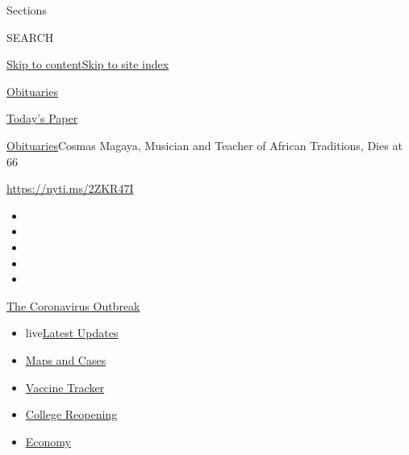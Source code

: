 Sections

SEARCH

\protect\hyperlink{site-content}{Skip to
content}\protect\hyperlink{site-index}{Skip to site index}

\href{https://www.nytimes.com/section/obituaries}{Obituaries}

\href{https://myaccount.nytimes.com/auth/login?response_type=cookie\&client_id=vi}{}

\href{https://www.nytimes.com/section/todayspaper}{Today's Paper}

\href{/section/obituaries}{Obituaries}\textbar{}Cosmas Magaya, Musician
and Teacher of African Traditions, Dies at 66

\url{https://nyti.ms/2ZKR47I}

\begin{itemize}
\item
\item
\item
\item
\item
\end{itemize}

\href{https://www.nytimes.com/news-event/coronavirus?action=click\&pgtype=Article\&state=default\&region=TOP_BANNER\&context=storylines_menu}{The
Coronavirus Outbreak}

\begin{itemize}
\tightlist
\item
  live\href{https://www.nytimes.com/2020/08/03/world/coronavirus-covid-19.html?action=click\&pgtype=Article\&state=default\&region=TOP_BANNER\&context=storylines_menu}{Latest
  Updates}
\item
  \href{https://www.nytimes.com/interactive/2020/us/coronavirus-us-cases.html?action=click\&pgtype=Article\&state=default\&region=TOP_BANNER\&context=storylines_menu}{Maps
  and Cases}
\item
  \href{https://www.nytimes.com/interactive/2020/science/coronavirus-vaccine-tracker.html?action=click\&pgtype=Article\&state=default\&region=TOP_BANNER\&context=storylines_menu}{Vaccine
  Tracker}
\item
  \href{https://www.nytimes.com/2020/08/02/us/covid-college-reopening.html?action=click\&pgtype=Article\&state=default\&region=TOP_BANNER\&context=storylines_menu}{College
  Reopening}
\item
  \href{https://www.nytimes.com/live/2020/08/03/business/stock-market-today-coronavirus?action=click\&pgtype=Article\&state=default\&region=TOP_BANNER\&context=storylines_menu}{Economy}
\end{itemize}

